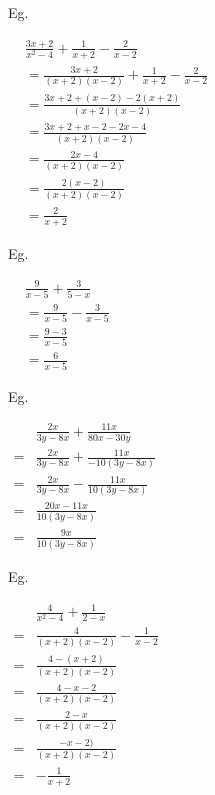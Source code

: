 \documentclass[twocolumn]{article}
\begin{document}
\bigskip 

\noindent 
Eg. 

\noindent 
$\begin{aligned} & \frac{3 x+2}{x^2-4}+\frac{1}{x+2}-\frac{2}{x-2} \\ &= \frac{3 x+2}{(x+2)(x-2)}+\frac{1}{x+2}-\frac{2}{x-2} \\ &= \frac{3 x+2+(x-2)-2(x+2)}{(x+2)(x-2)} \\ &= \frac{3 x+2+x-2-2 x-4}{(x+2)(x-2)} \\ &= \frac{2 x-4}{(x+2)(x-2)} \\ &= \frac{2(x-2)}{(x+2)(x-2)} \\ &= \frac{2}{x+2}\end{aligned}$

\bigskip 

\noindent 
Eg. 

\noindent 
$
\begin{aligned}
	& \frac{9}{x-5}+\frac{3}{5-x} \\
	& =\frac{9}{x-5}-\frac{3}{x-5} \\
	& =\frac{9-3}{x-5} \\
	& =\frac{6}{x-5}
\end{aligned}
$

\bigskip 

\bigskip 

\bigskip 

\bigskip 

\bigskip 

\bigskip 

\bigskip 

\bigskip 

\noindent 
Eg. 

\noindent 
$\begin{aligned} & \frac{2 x}{3 y-8 x}+\frac{11 x}{80 x-30 y} \\ = & \frac{2 x}{3 y-8 x}+\frac{11 x}{-10(3 y-8 x)} \\ = & \frac{2 x}{3 y-8 x}-\frac{11 x}{10(3 y-8 x)} \\ = & \frac{20 x-11 x}{10(3 y-8 x)} \\ = & \frac{9 x}{10(3 y-8 x)}\end{aligned}$

\bigskip 

\noindent 
Eg. 

\noindent 
$\begin{aligned} & \frac{4}{x^2-4}+\frac{1}{2-x} \\ = & \frac{4}{(x+2)(x-2)}-\frac{1}{x-2} \\ = & \frac{4-(x+2)}{(x+2)(x-2)} \\ = & \frac{4-x-2}{(x+2)(x-2)} \\ = & \frac{2-x}{(x+2)(x-2)} \\ = & \frac{-x-2)}{(x+2)(x-2)} \\ = & -\frac{1}{x+2}\end{aligned}$
\end{document}
